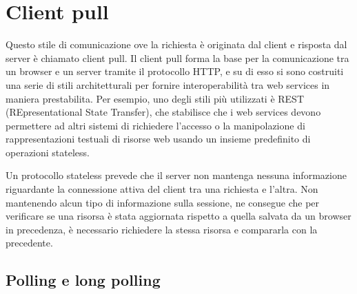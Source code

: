 \documentclass[12pt,a4paper,openright]{report}
\begin{document}
\section{Client pull}\label{sec_clientpull}

Questo stile di comunicazione ove la richiesta è originata dal client e risposta dal server è chiamato client pull. Il client pull forma la base per la comunicazione tra un browser e un server tramite il protocollo HTTP, e su di esso si sono costruiti una serie di stili architetturali per fornire interoperabilità tra web services in maniera prestabilita. Per esempio, uno degli stili più utilizzati è REST (REpresentational State Transfer), che stabilisce che i web services devono permettere ad altri sistemi di richiedere l’accesso o la manipolazione di rappresentazioni testuali di risorse web usando un insieme predefinito di operazioni stateless.

\bigskip

Un protocollo stateless prevede che il server non mantenga nessuna informazione riguardante la connessione attiva del client tra una richiesta e l’altra. Non mantenendo alcun tipo di informazione sulla sessione, ne consegue che per verificare se una risorsa è stata aggiornata rispetto a quella salvata da un browser in precedenza, è necessario richiedere la stessa risorsa e compararla con la precedente.

\subsection{Polling e long polling}
\end{document}

